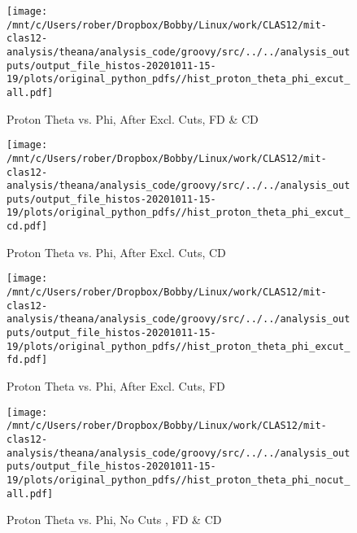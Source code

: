 \documentclass{article}
\begin{document}
\begin{landscape}
    \begin{figure}[h]
        \centering

        \texttt{[image: /mnt/c/Users/rober/Dropbox/Bobby/Linux/work/CLAS12/mit-clas12-analysis/theana/analysis\_code/groovy/src/../../analysis\_outputs/output\_file\_histos-20201011-15-19/plots/original\_python\_pdfs//hist\_proton\_theta\_phi\_excut\_all.pdf]}
        \captionsetup{textformat=empty,labelformat=blank}
        \caption{Proton Theta vs. Phi, After Excl. Cuts, FD \& CD}
    \end{figure}
    \clearpage
    
    \begin{figure}[h]
        \centering

        \texttt{[image: /mnt/c/Users/rober/Dropbox/Bobby/Linux/work/CLAS12/mit-clas12-analysis/theana/analysis\_code/groovy/src/../../analysis\_outputs/output\_file\_histos-20201011-15-19/plots/original\_python\_pdfs//hist\_proton\_theta\_phi\_excut\_cd.pdf]}
        \captionsetup{textformat=empty,labelformat=blank}
        \caption{Proton Theta vs. Phi, After Excl. Cuts, CD}
    \end{figure}
    \clearpage
    
    \begin{figure}[h]
        \centering

        \texttt{[image: /mnt/c/Users/rober/Dropbox/Bobby/Linux/work/CLAS12/mit-clas12-analysis/theana/analysis\_code/groovy/src/../../analysis\_outputs/output\_file\_histos-20201011-15-19/plots/original\_python\_pdfs//hist\_proton\_theta\_phi\_excut\_fd.pdf]}
        \captionsetup{textformat=empty,labelformat=blank}
        \caption{Proton Theta vs. Phi, After Excl. Cuts, FD}
    \end{figure}
    \clearpage
    
    \begin{figure}[h]
        \centering

        \texttt{[image: /mnt/c/Users/rober/Dropbox/Bobby/Linux/work/CLAS12/mit-clas12-analysis/theana/analysis\_code/groovy/src/../../analysis\_outputs/output\_file\_histos-20201011-15-19/plots/original\_python\_pdfs//hist\_proton\_theta\_phi\_nocut\_all.pdf]}
        \captionsetup{textformat=empty,labelformat=blank}
        \caption{Proton Theta vs. Phi, No Cuts , FD \& CD}
    \end{figure}
    \clearpage
    
    \begin{figure}[h]
        \centering


\end{figure}
\end{landscape}
\end{document}
